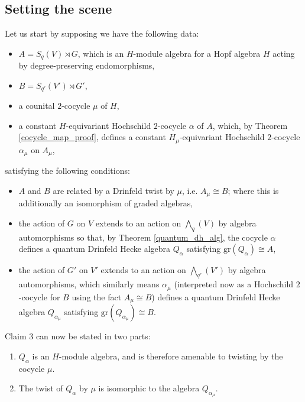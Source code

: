 \documentclass[10pt]{article}
\newcommand{\gr}{\text{gr}}
\theoremstyle{definition}
\begin{document}
\subsection{Setting the scene}\label{setting_the_scene}
Let us start by supposing we have the following data:
\begin{itemize}
    \item $A=S_q(V)\rtimes G$, which is an $H$-module algebra for a Hopf algebra $H$ acting by degree-preserving endomorphisms,
    \item $B=S_{q'}(V')\rtimes G'$,
    \item a counital $2$-cocycle $\mu$ of $H$, 
    \item a constant $H$-equivariant Hochschild $2$-cocycle $\alpha$ of $A$, which, by Theorem \ref{cocycle_map_proof}, defines a constant $H_\mu$-equivariant Hochschild $2$-cocycle $\alpha_\mu$ on $A_\mu$,
\end{itemize}
satisfying the following conditions:
\begin{itemize}
    \item $A$ and $B$ are related by a Drinfeld twist by $\mu$, i.e. $A_\mu \cong B$; where this is additionally an isomorphism of graded algebras,
    \item the action of $G$ on $V$ extends to an action on $\bigwedge_q(V)$ by algebra automorphisms so that, by Theorem \ref{quantum_dh_alg}, the cocycle $\alpha$ defines a quantum Drinfeld Hecke algebra $Q_\alpha$ satisfying $\gr(Q_\alpha)\cong A$,
    \item the action of $G'$ on $V'$ extends to an action on $\bigwedge_{q'}(V')$ by algebra automorphisms, which similarly means $\alpha_\mu$ (interpreted now as a Hochschild $2$-cocycle for $B$ using the fact $A_\mu\cong B$) defines a quantum Drinfeld Hecke algebra $Q_{\alpha_\mu}$ satisfying $\gr(Q_{\alpha_\mu})\cong B$.
\end{itemize}
Claim 3 can now be stated in two parts:
\begin{enumerate}[label=(\alph*)]
  \item $Q_\alpha$ is an $H$-module algebra, and is therefore amenable to twisting by the cocycle $\mu$.
  \item The twist of $Q_\alpha$ by $\mu$ is isomorphic to the algebra $Q_{\alpha_\mu}$.
\end{enumerate}
\end{document}
